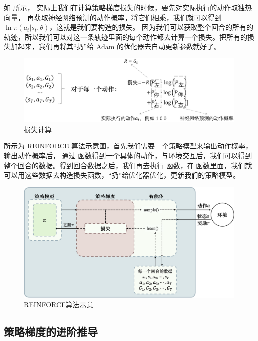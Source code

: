 如 所示，
实际上我们在计算策略梯度损失的时候，要先对实际执行的动作取独热向量，
再获取神经网络预测的动作概率，将它们相乘，我们就可以得到 $\ln \pi(a_t|s_t,\theta)$，这就是我们要构造的损失。
因为我们可以获取整个回合的所有的轨迹，所以我们可以对这一条轨迹里面的每个动作都去计算一个损失。把所有的损失加起来，我们再将其“扔”给 Adam 的优化器去自动更新参数就好了。
\begin{figure}[hbt]
    \centering
    \includegraphics[width=0.5\linewidth]{ch6/figs/loss_compute.png}
    \caption{损失计算}
    \label{fig:loss_compute}
\end{figure}

 所示为 REINFORCE 算法示意图，首先我们需要一个策略模型来输出动作概率，输出动作概率后，
通过  函数得到一个具体的动作，与环境交互后，我们可以得到整个回合的数据。得到回合数据之后，我们再去执行 函数，在  函数里面，我们就可以用这些数据去构造损失函数，“扔”给优化器优化，更新我们的策略模型。
\begin{figure}[hbt]
    \centering
    \includegraphics[width=0.5\linewidth]{ch6/figs/REINFORCE_process.png}
    \caption{REINFORCE算法示意}
    \label{fig:REINFORCE_process}
\end{figure}

\subsection{策略梯度的进阶推导}

